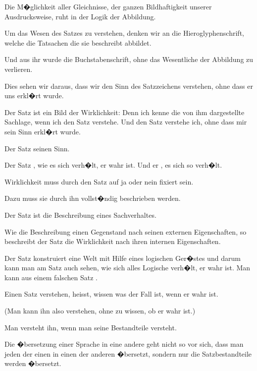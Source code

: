 \begin{propositions}
{Die M�glichkeit aller Gleichnisse, der ganzen
Bildhaftigkeit unserer Ausdrucksweise, ruht in der
Logik der Abbildung.}


{Um das Wesen des Satzes zu verstehen, denken
wir an die Hieroglyphenschrift, welche die Tatsachen
die sie beschreibt abbildet.

Und aus ihr wurde die Buchstabenschrift, ohne
das Wesentliche der Abbildung zu verlieren.}


{Dies sehen wir daraus, dass wir den Sinn des
Satzzeichens verstehen, ohne dass er uns erkl�rt
wurde.}


{Der Satz ist ein Bild der Wirklichkeit: Denn
ich kenne die von ihm dargestellte Sachlage, wenn
ich den Satz verstehe. Und den Satz verstehe ich,
ohne dass mir sein Sinn erkl�rt wurde.}


{Der Satz  seinen Sinn.

Der Satz , wie es sich verh�lt,  er
wahr ist. Und er ,  es sich so verh�lt.}


{ Wirklichkeit muss durch den Satz auf ja
oder nein fixiert sein.

Dazu muss sie durch ihn vollst�ndig beschrieben
werden.

Der Satz ist die Beschreibung eines Sachverhaltes.

Wie die Beschreibung einen Gegenstand nach
seinen externen Eigenschaften, so beschreibt der
Satz die Wirklichkeit nach ihren internen Eigenschaften.

Der Satz konstruiert eine Welt mit Hilfe eines
logischen Ger�stes und darum kann man am Satz
auch sehen, wie sich alles Logische verh�lt, 
er wahr ist. Man kann aus einem falschen Satz
.}


{Einen Satz verstehen, heisst, wissen was der
Fall ist, wenn er wahr ist.

(Man kann ihn also verstehen, ohne zu wissen,
ob er wahr ist.)

Man versteht ihn, wenn man seine Bestandteile
versteht.}


{Die �bersetzung einer Sprache in eine andere
geht nicht so vor sich, dass man jeden  der
einen in einen  der anderen �bersetzt, sondern
nur die Satzbestandteile werden �bersetzt.

}
\end{propositions}
